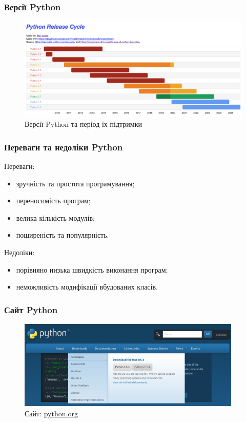 \begin{frame}
\frametitle{Версії Python}
\begin{figure}
  \begin{center}
    \includegraphics[width=\textwidth,height=0.5\textheight]{pictures/python_versions}
  \caption{Версії Python та період їх підтримки}
\label{versions}
  \end{center}
\end{figure}


\end{frame}

\begin{frame}
\frametitle{Переваги та недоліки Python}
Переваги:
\begin{itemize}
  \item зручність та простота програмування;
  \item переносимість програм;
  \item велика кількість модулів;
  \item поширеність та популярність.
\end{itemize}
Недоліки:
\begin{itemize}
  \item порівняно низька швидкість виконання програм;
  \item неможливість модифікації вбудованих класів.
\end{itemize}
\end{frame}

\begin{frame}
\frametitle{Сайт Python}
\begin{figure}
\begin{center}
 \includegraphics[width=0.95\textwidth]{pictures/python_site.png}
\caption{Сайт: \href{https://python.org/}{python.org}}
\label{python_site} 
\end{center}
\end{figure}

\end{frame}

